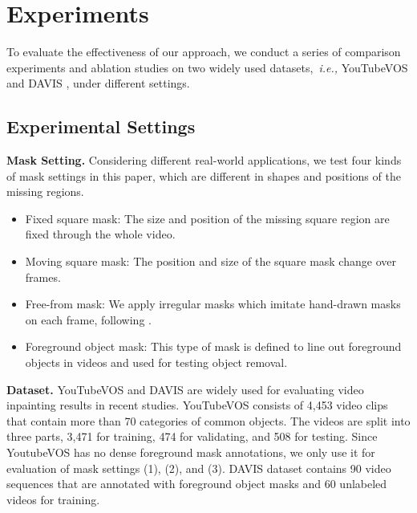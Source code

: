 


\section{Experiments}\label{sec:exp}
To evaluate the effectiveness of our approach, we conduct a series of comparison experiments and ablation studies on two widely used datasets,~\emph{i.e.,} YouTubeVOS \cite{xu2018Youtube} and DAVIS \cite{davis_2017}, under different settings.

\subsection{Experimental Settings}
\noindent \textbf{Mask Setting.} Considering different real-world applications, we test four kinds of mask settings in this paper, which are different in shapes and positions of the missing regions. 
\begin{itemize}
\item Fixed square mask: The size and position of the missing square region are fixed through the whole video. 
\item Moving square mask: The position and size of the square mask change over frames. 
\item Free-from mask: We apply irregular masks which imitate hand-drawn masks on each frame, following \cite{liu2018partialinpainting}. 
\item Foreground object mask: This type of mask is defined to line out foreground objects in videos and used for testing object removal.
\end{itemize}

\noindent\textbf{Dataset.} 
YouTubeVOS and DAVIS are widely used for evaluating video inpainting results in recent studies.
YouTubeVOS consists of 4,453 video clips that contain more than 70 categories of common objects. 
The videos are split into three parts, 3,471 for training, 474 for validating, and 508 for testing. Since YoutubeVOS has no dense foreground mask annotations, we only use it for evaluation of mask settings (1), (2), and (3). 
% 
DAVIS dataset contains 90 video sequences that are annotated with foreground object masks and 60 unlabeled videos for training.

